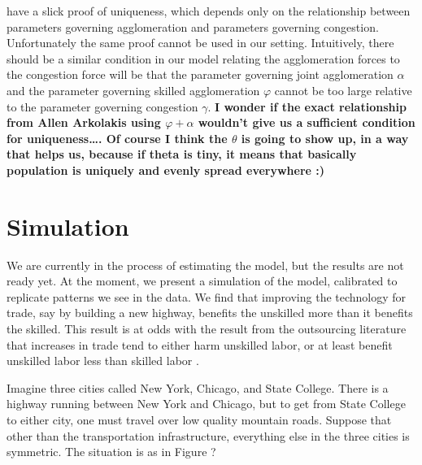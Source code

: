 \documentclass{article}
\begin{document}
\citet{allen2014trade} have a slick proof of uniqueness, which depends only on the relationship between parameters governing agglomeration and parameters governing congestion.  Unfortunately the same proof cannot be used in our setting.  Intuitively, there should be a similar condition in our model relating the agglomeration forces to the congestion force will be that the parameter governing joint agglomeration $\alpha$ and the parameter governing skilled agglomeration $\varphi$ cannot be too large relative to the parameter governing congestion $\gamma$.  \textbf{I wonder if the exact relationship from Allen Arkolakis using $\varphi + \alpha$ wouldn't give us a sufficient condition for uniqueness\dots .  Of course I think the $\theta$ is going to show up, in a way that helps us, because if theta is tiny, it means that basically population is uniquely and evenly spread everywhere :)}  

\section{Simulation}

We are currently in the process of estimating the model, but the results are not ready yet.  At the moment, we present a simulation of the model, calibrated to replicate patterns we see in the data.  We find that improving the technology for trade, say by building a new highway, benefits the unskilled more than it benefits the skilled.  This result is at odds with the result from the outsourcing literature that increases in trade tend to either harm unskilled labor, or at least benefit unskilled labor less than skilled labor \citep{hummels2014wage}.

Imagine three cities called New York, Chicago, and State College.  There is a highway running between New York and Chicago, but to get from State College to either city, one must travel over low quality mountain roads.  Suppose that other than the transportation infrastructure, everything else in the three cities is symmetric.  The situation is as in Figure ? 
\end{document}
